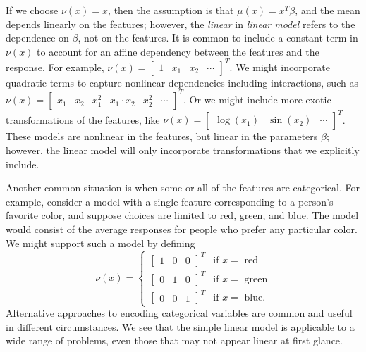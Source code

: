 \documentclass[12pt]{article}
\begin{document}
If we choose $\nu(x) = x$, then the assumption is that $\mu(x) = x^T \beta$, and the mean depends linearly on the features; however, the \textit{linear} in \textit{linear model} refers to the dependence on $\beta$, not on the features. It is common to include a constant term in $\nu(x)$ to account for an affine dependency between the features and the response. For example, $\nu(x) = \begin{bmatrix} 1 & x_1 & x_2 & \cdots \end{bmatrix}^T$. We might incorporate quadratic terms to capture nonlinear dependencies including interactions, such as $\nu(x) = \begin{bmatrix}x_1 & x_2 & x_1^2 & x_1 \cdot x_2 & x_2^2 & \cdots \end{bmatrix}^T$. Or we might include more exotic transformations of the features, like $\nu(x) = \begin{bmatrix} \log(x_1) & \sin(x_2) & \cdots \end{bmatrix}^T$. These models are nonlinear in the features, but linear in the parameters $\beta$; however, the linear model will only incorporate transformations that we explicitly include.

Another common situation is when some or all of the features are categorical. For example, consider a model with a single feature corresponding to a person's favorite color, and suppose choices are limited to red, green, and blue. The model would consist of the average responses for people who prefer any particular color. We might support such a model by defining
\begin{displaymath}
   \nu(x) = \begin{cases}
       \begin{bmatrix} 1 & 0 & 0 \end{bmatrix}^T & \textrm{if $x = $ red} \\
       \begin{bmatrix} 0 & 1 & 0 \end{bmatrix}^T & \textrm{if $x = $ green} \\
       \begin{bmatrix} 0 & 0 & 1 \end{bmatrix}^T & \textrm{if $x = $ blue.}
   \end{cases}
\end{displaymath}
Alternative approaches to encoding categorical variables are common and useful in different circumstances. We see that the simple linear model is applicable to a wide range of problems, even those that may not appear linear at first glance.
\end{document}
